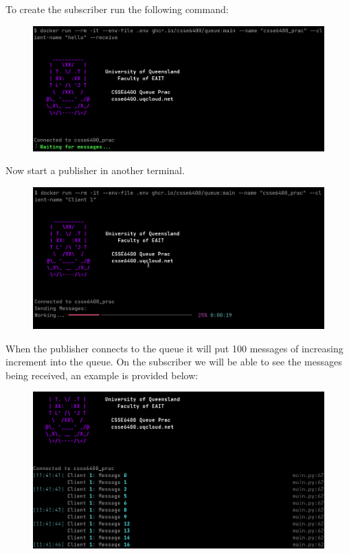\documentclass{csse4400}
\begin{document}
To create the subscriber run the following command:


\begin{figure}[H]
  \includegraphics[width=\textwidth]{images/stacksub}
\end{figure}

Now start a publisher in another terminal.


\begin{figure}[H]
  \includegraphics[width=\textwidth]{images/stackpub}
\end{figure}

When the publisher connects to the queue it will put 100 messages of increasing increment into the queue.
On the subscriber we will be able to see the messages being received, an example is provided below:

\begin{figure}[H]
  \includegraphics[width=\textwidth]{images/stacksubdata}
\end{figure}
\end{document}
